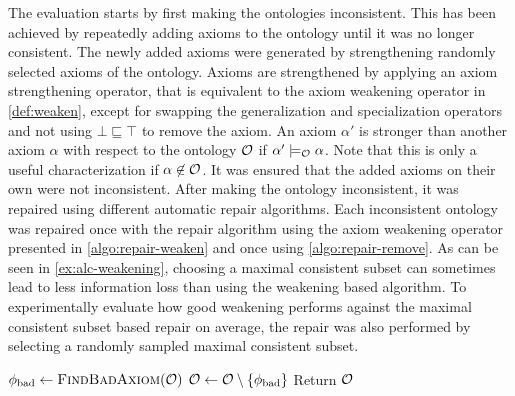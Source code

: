 The evaluation starts by first making the ontologies inconsistent. This has been achieved by repeatedly adding axioms to the ontology until it was no longer consistent. The newly added axioms were generated by strengthening randomly selected axioms of the ontology. Axioms are strengthened by applying an axiom strengthening operator, that is equivalent to the axiom weakening operator in \cref{def:weaken}, except for swapping the generalization and specialization operators and not using $\bot \sqsubseteq \top$ to remove the axiom. An axiom $\alpha'$ is stronger than another axiom $\alpha$ with respect to the ontology $\mathcal{O}$ if $\alpha' \models_\mathcal{O} \alpha$. Note that this is only a useful characterization if $\alpha \not\in \mathcal{O}$. It was ensured that the added axioms on their own were not inconsistent. After making the ontology inconsistent, it was repaired using different automatic repair algorithms. Each inconsistent ontology was repaired once with the repair algorithm using the axiom weakening operator presented in \cref{algo:repair-weaken} and once using \cref{algo:repair-remove}. As can be seen in \cref{ex:alc-weakening}, choosing a maximal consistent subset can sometimes lead to less information loss than using the weakening based algorithm. To experimentally evaluate how good weakening performs against the maximal consistent subset based repair on average, the repair was also performed by selecting a randomly sampled maximal consistent subset.

\begin{algorithm}[ht]
  \begin{algorithmic}
      \State $\phi_\textnormal{bad} \gets \textsc{FindBadAxiom}(\mathcal{O})$
      \State $\mathcal{O} \gets \mathcal{O} \setminus \{\phi_\textnormal{bad}\}$
    \EndWhile
    \State Return $\mathcal{O}$
  \end{algorithmic}
  \caption{$\textsc{RepairOntologyRemove}(\Omc)$}
  \label{algo:repair-remove}
\end{algorithm}

